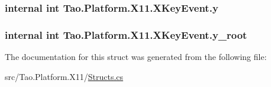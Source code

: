 \label{struct_tao_1_1_platform_1_1_x11_1_1_x_key_event_aa99e7c8d47172a74b750f7ab289e1598}
\hypertarget{struct_tao_1_1_platform_1_1_x11_1_1_x_key_event_a84bf8968a2eb8b29873e835aace88c82}{
\subsubsection[{y}]{\setlength{\rightskip}{0pt plus 5cm}internal int {\bf Tao.Platform.X11.XKeyEvent.y}}}
\label{struct_tao_1_1_platform_1_1_x11_1_1_x_key_event_a84bf8968a2eb8b29873e835aace88c82}
\hypertarget{struct_tao_1_1_platform_1_1_x11_1_1_x_key_event_a7c45b80c42f0cc1ad88cc2e99dbed910}{
\subsubsection[{y\_\-root}]{\setlength{\rightskip}{0pt plus 5cm}internal int {\bf Tao.Platform.X11.XKeyEvent.y\_\-root}}}
\label{struct_tao_1_1_platform_1_1_x11_1_1_x_key_event_a7c45b80c42f0cc1ad88cc2e99dbed910}


The documentation for this struct was generated from the following file:\begin{DoxyCompactItemize}
\item 
src/Tao.Platform.X11/\hyperlink{_structs_8cs}{Structs.cs}\end{DoxyCompactItemize}
